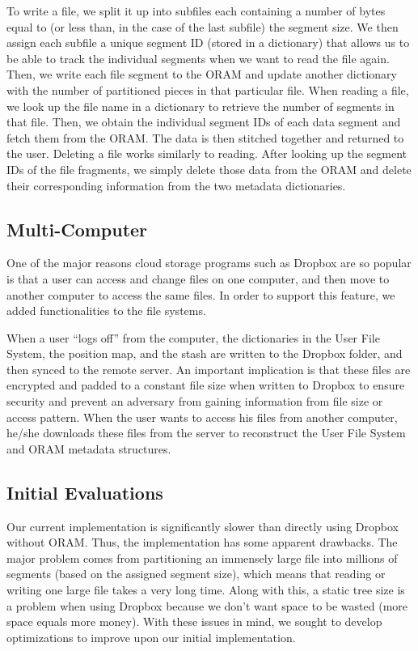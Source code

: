 \documentclass{article}
\begin{document}
\begin{multicols}{2}

\par To write a file, we split it up into subfiles each containing a number of bytes equal to (or less than, in the case of the last subfile) the segment size. We then assign each subfile a unique segment ID (stored in a dictionary) that allows us to be able to track the individual segments when we want to read the file again. Then, we write each file segment to the ORAM and update another dictionary with the number of partitioned pieces in that particular file. When reading a file, we look up the file name in a dictionary to retrieve the number of segments in that file. Then, we obtain the individual segment IDs of each data segment and fetch them from the ORAM. The data is then stitched together and returned to the user. Deleting a file works similarly to reading. After looking up the segment IDs of the file fragments, we simply delete those data from the ORAM and delete their corresponding information from the two metadata dictionaries.

\subsection{Multi-Computer}

One of the major reasons cloud storage programs such as Dropbox are so popular is that a user can access and change files on one computer, and then move to another computer to access the same files. In order to support this feature, we added functionalities to the file systems.
\par When a user “logs off” from the computer, the dictionaries in the User File System, the position map, and the stash are written to the Dropbox folder, and then synced to the remote server. An important implication is that these files are encrypted and padded to a constant file size when written to Dropbox to ensure security and prevent an adversary from gaining information from file size or access pattern. When the user wants to access his files from another computer, he/she downloads these files from the server to reconstruct the User File System and ORAM metadata structures.

\subsection{Initial Evaluations}

Our current implementation is significantly slower than directly using Dropbox without ORAM. Thus, the implementation has some apparent drawbacks. The major problem comes from partitioning an immensely large file into millions of segments (based on the assigned segment size), which means that reading or writing one large file takes a very long time. Along with this, a static tree size is a problem when using Dropbox because we don’t want space to be wasted (more space equals more money). With these issues in mind, we sought to develop optimizations to improve upon our initial implementation.


\end{multicols}
\end{document}
